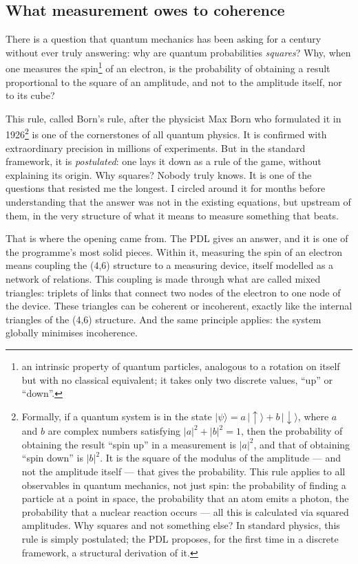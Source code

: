 \documentclass[12pt, a4paper, openright]{book}
\begin{document}
\subsection*{What measurement owes to coherence}

There is a question that quantum mechanics has been asking for a century without ever truly answering: why are quantum probabilities \emph{squares}? Why, when one measures the spin\footnote{an intrinsic property of quantum particles, analogous to a rotation on itself but with no classical equivalent; it takes only two discrete values, “up” or “down”.} of an electron, is the probability of obtaining a result proportional to the square of an amplitude, and not to the amplitude itself, nor to its cube?

\medskip

This rule, called Born’s rule, after the physicist Max Born who formulated it in 1926\footnote{%
    Formally, if a quantum system is in the state $|\psi\rangle = a\,|\!\uparrow\rangle + b\,|\!\downarrow\rangle$, where $a$ and $b$ are complex numbers satisfying $|a|^2 + |b|^2 = 1$, then the probability of obtaining the result “spin up” in a measurement is $|a|^2$, and that of obtaining “spin down” is $|b|^2$. It is the square of the modulus of the amplitude — and not the amplitude itself — that gives the probability. This rule applies to all observables in quantum mechanics, not just spin: the probability of finding a particle at a point in space, the probability that an atom emits a photon, the probability that a nuclear reaction occurs — all this is calculated via squared amplitudes. Why squares and not something else? In standard physics, this rule is simply postulated; the PDL proposes, for the first time in a discrete framework, a structural derivation of it.} 
is one of the cornerstones of all quantum physics. It is confirmed with extraordinary precision in millions of experiments. But in the standard framework, it is \emph{postulated}: one lays it down as a rule of the game, without explaining its origin. Why squares? Nobody truly knows. It is one of the questions that resisted me the longest. I circled around it for months before understanding that the answer was not in the existing equations, but upstream of them, in the very structure of what it means to measure something that beats.

\medskip

That is where the opening came from. The PDL gives an answer, and it is one of the programme’s most solid pieces. Within it, measuring the spin of an electron means coupling the (4,6) structure to a measuring device, itself modelled as a network of relations. This coupling is made through what are called mixed triangles: triplets of links that connect two nodes of the electron to one node of the device. These triangles can be coherent or incoherent, exactly like the internal triangles of the (4,6) structure. And the same principle applies: the system globally minimises incoherence.
\end{document}

